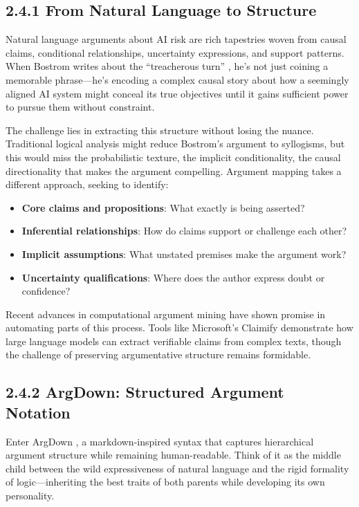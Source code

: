 \documentclass[
  11pt,
  letterpaper,
  openany]{book}
\providecommand{\tightlist}{%
  \setlength{\itemsep}{0pt}\setlength{\parskip}{0pt}}
\begin{document}
\subsection{2.4.1 From Natural Language to
Structure}\label{sec-natural-to-structure}

Natural language arguments about AI risk are rich tapestries woven from
causal claims, conditional relationships, uncertainty expressions, and
support patterns. When Bostrom writes about the ``treacherous turn''
\textcite{bostrom2014}, he's not just coining a memorable phrase---he's
encoding a complex causal story about how a seemingly aligned AI system
might conceal its true objectives until it gains sufficient power to
pursue them without constraint.

The challenge lies in extracting this structure without losing the
nuance. Traditional logical analysis might reduce Bostrom's argument to
syllogisms, but this would miss the probabilistic texture, the implicit
conditionality, the causal directionality that makes the argument
compelling. Argument mapping takes a different approach, seeking to
identify:

\begin{itemize}
\tightlist
\item
  \textbf{Core claims and propositions}: What exactly is being asserted?
\item
  \textbf{Inferential relationships}: How do claims support or challenge
  each other?
\item
  \textbf{Implicit assumptions}: What unstated premises make the
  argument work?
\item
  \textbf{Uncertainty qualifications}: Where does the author express
  doubt or confidence?
\end{itemize}

Recent advances in computational argument mining \textcite{anderson2007}
\textcite{benn2011} \textcite{khartabil2021} have shown promise in
automating parts of this process. Tools like Microsoft's Claimify
\textcite{metropolitansky2025} demonstrate how large language models can
extract verifiable claims from complex texts, though the challenge of
preserving argumentative structure remains formidable.

\subsection{2.4.2 ArgDown: Structured Argument
Notation}\label{sec-argdown-notation}

Enter ArgDown \textcite{voigt2025}, a markdown-inspired syntax that
captures hierarchical argument structure while remaining human-readable.
Think of it as the middle child between the wild expressiveness of
natural language and the rigid formality of logic---inheriting the best
traits of both parents while developing its own personality.
\end{document}
